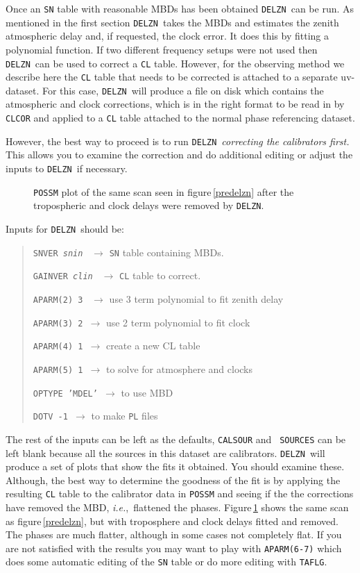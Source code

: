 \documentclass[preprint]{aastex}
\newcommand{\DELZN}{{\tt DELZN}}
\newcommand{\ie}{{\it i.e.},}
\begin{document}
Once an {\tt SN} table with reasonable MBDs has been obtained \DELZN\
can be run.
As mentioned in the first section \DELZN\ takes the MBDs and estimates
the zenith atmospheric delay and, if requested, the clock error.  It does this by fitting a
polynomial function.  If two different frequency setups were not used then
\DELZN\ can be used to correct a {\tt CL} table.  However, for the observing method
we describe here the {\tt CL} table that needs to be corrected is attached to
a separate uv-dataset.  For this case, \DELZN\ will produce a file on disk which
contains the
atmospheric and clock corrections,
which is in the right format to be read in by {\tt CLCOR} and applied to a
{\tt CL} table attached to the normal phase referencing dataset.

However, the best way to proceed is to run \DELZN\
{\it correcting the calibrators first.}
This allows you to examine the correction and do additional editing or
adjust the inputs to \DELZN\, if necessary.

\vfil
\eject

\begin{figure}[t!]
\caption{{\tt POSSM} plot of the same scan seen in figure\,\ref{predelzn}
after the tropospheric and clock delays were removed by \DELZN.}
\label{postdelzn}
\end{figure}

Inputs for \DELZN\ should be:
\begin{quote}
{\tt SNVER {\it snin\/} } {$\longrightarrow$ {\tt SN} table containing MBDs.}

{\tt GAINVER {\it clin\/} } {$\longrightarrow$ {\tt CL} table to correct.}

{\tt APARM(2) 3 } {$\longrightarrow$ use 3 term polynomial to fit zenith delay}

{\tt APARM(3) 2 }{$\longrightarrow$ use 2 term polynomial to fit clock}

{\tt APARM(4) 1 }{$\longrightarrow$ create a new CL table}

{\tt APARM(5) 1 }{$\longrightarrow$ to solve for atmosphere and clocks}

{\tt OPTYPE 'MDEL' }{$\longrightarrow$ to use MBD}

{\tt DOTV -1 }{$\longrightarrow$ to make {\tt PL} files}
\end{quote}
The rest of the inputs can be left as the defaults, {\tt CALSOUR} and {\tt
SOURCES} can be left blank because all the sources in this dataset are
calibrators.  \DELZN\ will produce a set of plots that show the fits it
obtained.  You should examine these.  Although, the best way to determine
the goodness of the fit is by applying the resulting {\tt CL} table to
the calibrator data in {\tt POSSM} and seeing if the the corrections
have removed the MBD, \ie\ flattened
the phases.  Figure\,\ref{postdelzn} shows the same scan as
figure\,\ref{predelzn}, but with troposphere and clock delays fitted and
removed.  The phases are much flatter, although in some cases not
completely flat.  If you are not satisfied
with the results you may want to play with {\tt APARM(6-7)} which does some
automatic editing of the {\tt SN} table or do more editing with {\tt TAFLG}.
\end{document}
